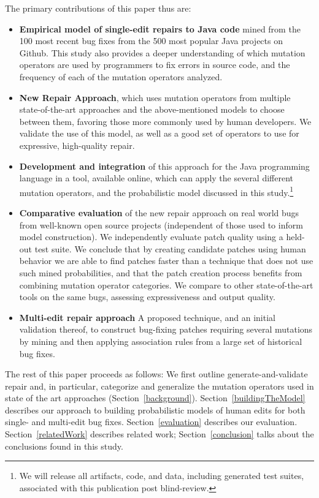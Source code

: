 \documentclass[conference]{IEEEtran}
\begin{document}
%
The primary contributions of this paper thus are:
\begin{itemize}
\item \textbf{Empirical model of single-edit repairs to Java code} mined
      from the 100 most recent bug fixes from the 500 most popular Java projects on
    Github. This study also provides a deeper
    understanding of which mutation operators are used by programmers to fix
    errors in source code, and the frequency of each of the mutation operators
    analyzed. 
	\item \textbf{New Repair Approach}, which uses mutation operators
    from multiple state-of-the-art approaches and
    the above-mentioned models to choose between them, favoring those more commonly
    used by human developers.  We validate the use of this model, as well as a
    good set of operators to use for expressive, high-quality repair.
    \item \textbf{Development and integration} of this approach for the Java
      programming language in a tool, available online, which can apply the
      several different mutation operators, and the probabilistic model
      discussed in this study.\footnote{We will release all artifacts, code, and
        data, including generated test suites, associated with this publication post blind-review.} %
  \item \textbf{Comparative evaluation} of the new repair approach on real world bugs from well-known open source projects (independent of those used to inform model
    construction). We independently evaluate patch quality using a held-out test
    suite. We conclude that by creating candidate patches using human behavior
    we are able to find patches faster than a technique that does not use such
    mined probabilities, and that the patch creation
    process benefits from combining mutation operator categories. We compare to
    other state-of-the-art tools on the same bugs, assessing expressiveness and
    output quality. 
  \item \textbf{Multi-edit repair approach} A proposed technique, and an initial
    validation thereof, to construct 
    bug-fixing patches requiring several mutations by mining and then applying association
    rules from a large set of historical bug fixes. 
\end{itemize}

The rest of this paper proceeds as follows: We first outline
generate-and-validate repair and, in particular, 
categorize and generalize the mutation operators used in state of the art
approaches (Section~\ref{background}). Section~\ref{buildingTheModel}
describes our approach to building probabilistic models of human 
edits for both single- and multi-edit bug fixes. Section~\ref{evaluation}
describes our evaluation. Section~\ref{relatedWork} describes
related work; Section~\ref{conclusion} talks about the conclusions found in this study. 
\end{document}
